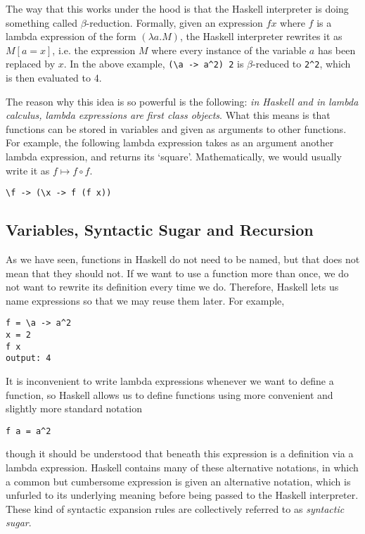 \documentclass[11	pt]{article}
\theoremstyle{nonumberplain}
\begin{document}
The way that this works under the hood is that the Haskell interpreter is doing something called $\beta$-reduction. Formally, given an expression $f x$ where $f$ is a lambda expression of the form $(\lambda a. M)$, the Haskell interpreter rewrites it as $M[a=x]$, i.e. the expression $M$ where every instance of the variable $a$ has been replaced by $x$. In the above example, \lstinline|(\a -> a^2) 2| is $\beta$-reduced to \lstinline|2^2|, which is then evaluated to 4.

The reason why this idea is so powerful is the following: \emph{in Haskell and in lambda calculus, lambda expressions are first class objects}. What this means is that functions can be stored in variables and given as arguments to other functions. For example, the following lambda expression takes as an argument another lambda expression, and returns its `square'. Mathematically, we would usually write it as $f \mapsto f \circ f$.
\begin{lstlisting}
\f -> (\x -> f (f x))
\end{lstlisting}

\subsection{Variables, Syntactic Sugar and Recursion}

As we have seen, functions in Haskell do not need to be named, but that does not mean that they should not. If we want to use a function more than once, we do not want to rewrite its definition every time we do. Therefore, Haskell lets us name expressions so that we may reuse them later. For example,
\begin{lstlisting}
f = \a -> a^2
x = 2
f x
output: 4
\end{lstlisting}

It is inconvenient to write lambda expressions whenever we want to define a function, so Haskell allows us to define functions using more convenient and slightly more standard notation
\begin{lstlisting}
f a = a^2
\end{lstlisting}
though it should be understood that beneath this expression is a definition via a lambda expression. Haskell contains many of these alternative notations, in which a common but cumbersome expression is given an alternative notation, which is unfurled to its underlying meaning before being passed to the Haskell interpreter. These kind of syntactic expansion rules are collectively referred to as \emph{syntactic sugar}.
\end{document}

